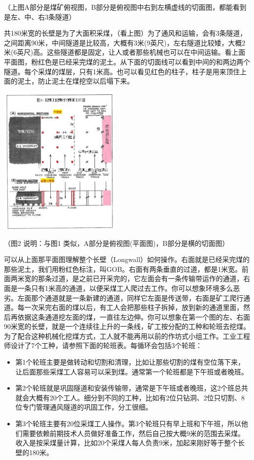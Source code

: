 （上图A部分是煤矿俯视图，B部分是俯视图中右到左横虚线的切面图，都能看到是左、中、右3条隧道）

共180米宽的长壁是为了大面积采煤，（看上图）为了通风和运输，会有3条隧道，之间距离90米，中间隧道是比较高，大概有3米(9英尺)，左右隧道比较矮，大概2米(6英尺)高。这些隧道都是固定，让人或者那些机械也可以在中间运输。看上面平面图，粉红色是已经采完煤的泥土。从下面的切面线可以看到中间的和两边两个隧道。每个采煤的煤层，只有1米高。也可以看见红色的柱子，柱子是用来顶住上面的泥土，防止泥土在煤挖空以后塌下来。


\includegraphics[width=6cm]{langwall2-修改52.jpg}

（图2 说明：与图1 类似，A部分是俯视图(平面图)，B部分是横的切面图）

可以从上面那平面图理解整个长壁（Longwall）如何操作。右面就是已经采完煤的那些泥土，我们用粉红色标注，叫GOB。右面有两条垂直的过道，都是1米宽。前面两米宽的那条过道，是之前已开采完的，它左面会有一条传输带运作的通道，右面是一条只有1米高的通道，以便采煤工人爬过去工作。你可以想象环境多么恶劣。左面那个通道就是一条新建的通道，同样它左面是传送带，右面是矿工爬行通道。每一次采完右面的煤以后，有工人会把那些柱子拆掉，放到新的通道里面，然后再依据这条通道挖左面的煤，一直往左边伸。你可以想象在第一个图的左、右面90米宽的长壁，就是一个连续往上升的一条线，矿工按分配的工种和轮班去挖煤。为了配合这种机械化挖煤方式，工人就不能再用以前的作坊式小组工作。工业工程师设计了7个工种，请参照下面的轮班表。每循环会包括3个轮班：

\begin{itemize}
\tightlist
\item
  第1个轮班主要是做转动和切割和清理，比如让那些切割的煤有空位落下来，让后面那些采煤工人容易可以采到煤。通常第一个轮班都是下午班或者晚班。
\item
  第2个轮班就是巩固隧道和安装传输带，通常是下午班或者晚班，这2个班总共就会大概有20个工人。细分到不同的工种，比如有2位只钻洞、2位只切割、8位专门管理通风隧道的巩固工作，分工很细。
\item
  第3个轮班主要有20位采煤工人操作。第3个轮班只有早上班和下午班，所以他们需要依赖前期技术人员做好准备工作，然后自己按大概9米的范围去采煤。收入是按采煤量计算，比如20个采煤人每人负责9米，加起来刚好等于整个长壁的180米。
\end{itemize}

